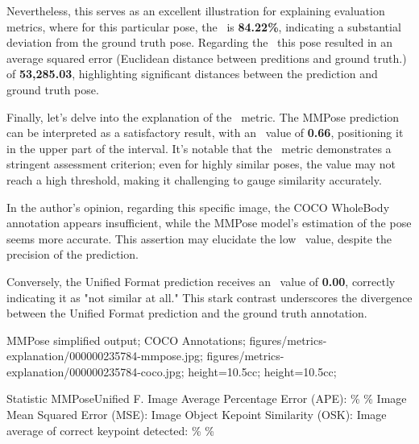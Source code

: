 Nevertheless, this serves as an excellent illustration for explaining evaluation metrics, where for this particular pose, the \APE\ is {\bf 84.22\%}, indicating a substantial deviation from the ground truth pose. Regarding the \MSE\, this pose resulted in an average squared error (Euclidean distance between preditions and ground truth.) of {\bf 53,285.03}, highlighting significant distances between the prediction and ground truth pose.

Finally, let's delve into the explanation of the \OKS\ metric. The MMPose prediction can be interpreted as a satisfactory result, with an \OKS\ value of {\bf 0.66}, positioning it in the upper part of the interval. It's notable that the \OKS\ metric demonstrates a stringent assessment criterion; even for highly similar poses, the value may not reach a high threshold, making it challenging to gauge similarity accurately.

In the author's opinion, regarding this specific image, the COCO WholeBody annotation appears insufficient, while the MMPose model's estimation of the pose seems more accurate. This assertion may elucidate the low \OKS\ value, despite the precision of the prediction.

Conversely, the Unified Format prediction receives an \OKS\ value of {\bf 0.00}, correctly indicating it as "not similar at all." This stark contrast underscores the divergence between the Unified Format prediction and the ground truth annotation.

    {
        MMPose simplified output;
        COCO Annotations;
    }
    {
        figures/metrics-explanation/000000235784-mmpose.jpg;
        figures/metrics-explanation/000000235784-coco.jpg;
    }
    {
        height=10.5cc;
        height=10.5cc;
    }


    \setupTABLE[r][1][style=bold]
    \setupTABLE[c][each][offset=3dd]
    \setupTABLE[frame=off]
    \setupTABLE[r][1][topframe=on,bottomframe=on]
    \setupTABLE[c][each][leftframe=on]
    \setupTABLE[c][1][leftframe=off]
    \setupTABLE[c][2,3][align=middle]
    \bTR\bTD Statistic                                   \eTD\bTD    MMPose\eTD\bTD     Unified F.\eTD\eTR
    \bTR\bTD Image Average Percentage Error (APE):       \eTD{}\% \eTD{}\% \eTD\eTR
    \bTR\bTD Image Mean Squared Error (MSE):             \eTD{} \eTD{} \eTD\eTR
    \bTR\bTD Image Object Kepoint Similarity (OSK):      \eTD{} \eTD{} \eTD\eTR
    \bTR\bTD Image average of correct keypoint detected: \eTD{}\% \eTD{}\% \eTD\eTR

